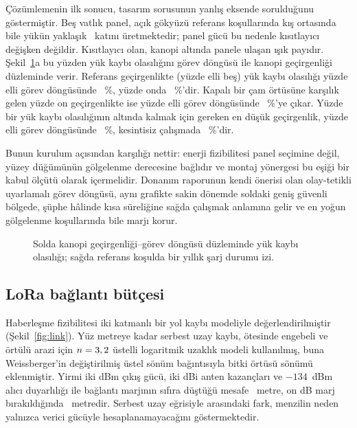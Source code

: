 \documentclass[11pt,a4paper]{article}
\begin{document}
Çözümlemenin ilk sonucu, tasarım sorusunun yanlış eksende sorulduğunu
göstermiştir. Beş vatlık panel, açık gökyüzü referans koşullarında kış
ortasında bile yükün yaklaşık \energyMargin\ katını üretmektedir; panel gücü
bu nedenle kısıtlayıcı değişken değildir. Kısıtlayıcı olan, kanopi altında
panele ulaşan ışık payıdır. Şekil~\ref{fig:energy}a bu yüzden yük kaybı
olasılığını görev döngüsü ile kanopi geçirgenliği düzleminde verir. Referans
geçirgenlikte (yüzde elli beş) yük kaybı olasılığı yüzde elli görev döngüsünde
\lolpFifty~\%, yüzde onda \lolpTen~\%'dir. Kapalı bir çam örtüsüne karşılık
gelen yüzde on geçirgenlikte ise yüzde elli görev döngüsünde \lolpShade~\%'ye
çıkar. Yüzde bir yük kaybı olasılığının altında kalmak için gereken en düşük
geçirgenlik, yüzde elli görev döngüsünde \canopyCritFifty~\%, kesintisiz
çalışmada \canopyCritFull~\%'dir.

Bunun kurulum açısından karşılığı nettir: enerji fizibilitesi panel seçimine
değil, yüzey düğümünün gölgelenme derecesine bağlıdır ve montaj yönergesi bu
eşiği bir kabul ölçütü olarak içermelidir. Donanım raporunun kendi önerisi olan
olay-tetikli uyarlamalı görev döngüsü, aynı grafikte sakin dönemde soldaki
geniş güvenli bölgede, şüphe hâlinde kısa süreliğine sağda çalışmak anlamına
gelir ve en yoğun gölgelenme koşullarında bile marjı korur.

\begin{figure}[htbp]\centering

\caption{Solda kanopi geçirgenliği--görev döngüsü düzleminde yük kaybı
olasılığı; sağda referans koşulda bir yıllık şarj durumu izi.}
\label{fig:energy}
\end{figure}

\subsection{LoRa bağlantı bütçesi}

Haberleşme fizibilitesi iki katmanlı bir yol kaybı modeliyle değerlendirilmiştir
(Şekil~\ref{fig:link}). Yüz metreye kadar serbest uzay kaybı, ötesinde engebeli
ve örtülü arazi için $n = 3,2$ üstelli logaritmik uzaklık modeli
kullanılmış, buna Weissberger'in değiştirilmiş üstel sönüm bağıntısıyla bitki
örtüsü sönümü eklenmiştir. Yirmi iki dBm çıkış gücü, iki dBi anten kazançları
ve $-134$~dBm alıcı duyarlılığı ile bağlantı marjının sıfıra düştüğü mesafe
\dMax~metre, on dB marj bırakıldığında \dMarginTen~metredir. Serbest uzay
eğrisiyle arasındaki fark, menzilin neden yalnızca verici gücüyle
hesaplanamayacağını göstermektedir.
\end{document}
